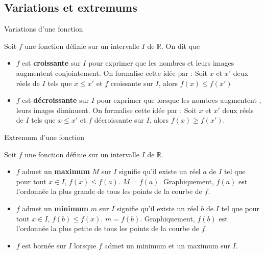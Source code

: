 \begin{pageCours} %


\section{Variations et extremums}

 
\begin{ThT}{Variations d'une fonction}

Soit $f$ une fonction définie sur un intervalle $I$ de $\mathbb R$. On dit que 
\begin{itemize}[leftmargin=*]
\item $f$ est \textbf{croissante} sur $I$ pour exprimer que les nombres et leurs images augmentent conjointement. On formalise cette idée par : Soit $x$ et $x'$ deux réels de $I$ tels que $x\leq x'$ et $f$ croissante sur $I$, alors $f(x) \leq f(x')$
\item $f$ est \textbf{décroissante} sur $I$ pour exprimer que lorsque les nombres augmentent , leurs images diminuent. On formalise cette idée par : Soit $x$ et $x'$ deux réels de $I$ tels que $x\leq x'$ et $f$ décroissante sur $I$, alors $f(x) \geq f(x')$.
\end{itemize} 
\end{ThT} 

  

%

\begin{DefT}{Extremum d'une fonction}

Soit $f$ une fonction définie sur un intervalle $I$ de $\mathbb{R}$. 
\begin{itemize}[leftmargin=*]
\item $f$ admet un \textbf{maximum} $M$ sur $I$ signifie qu'il existe un réel $a$ de $I$ tel que pour tout $x \in I$, $f(x)\leq f(a)$. $M=f(a)$. Graphiquement, $f(a)$ est l'ordonnée la plus grande de tous les points de la courbe de $f$.
\item $f$ admet un \textbf{minimum} $m$ sur $I$ signifie qu'il existe un réel $b$ de $I$ tel que pour tout $x \in I$, $f(b) \leq f(x)$. $m=f(b)$. Graphiquement, $f(b)$ est l'ordonnée la plus petite de tous les points de la courbe de $f$.
\item $f$ est bornée sur $I$ lorsque $f$ admet un minimum et un maximum sur $I$.
\end{itemize} 
\end{DefT} 




\end{pageCours}
